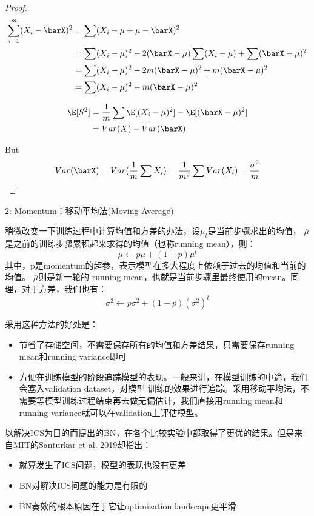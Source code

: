 \documentclass[11pt]{article}
\begin{document}
\begin{enumerate}
\begin{proof}
\begin{align*}
\sum_{i=1}^m(X_i-\barX)^2&=\sum(X_i-\mu+\mu-\barX)^2\\
&=\sum(X_i-\mu)^2-2(\barX-\mu)\sum(X_i-\mu)+\sum(\barX-\mu)^2\\
&=\sum(X_i-\mu)^2-2m(\barX-\mu)^2+m(\barX-\mu)^2\\
&=\sum(X_i-\mu)^2-m(\barX-\mu)^2
\end{align*}

\begin{align*}
\E[S^2]&=\frac{1}{m}\sum\E[(X_i-\mu)^2]-\E[(\barX-\mu)^2]\\
&=Var(X)-Var(\barX)
\end{align*}

But
\begin{equation*}
Var(\barX)=Var(\frac{1}{m}\sum X_i)=\frac{1}{m^2}\sum Var(X_i)=\frac{\sigma^2}{m}
\end{equation*}
\end{proof}


2: Momentum：移动平均法(Moving Average)

稍微改变一下训练过程中计算均值和方差的办法，设\(\mu_t\)是当前步骤求出的均值， \(\bar{\mu}\)是之前的训练步骤累积起来求得的均值（也称running mean），则：
\begin{equation*}
\bar{\mu}\gets p\bar{\mu}+(1-p)\mu^t
\end{equation*}
其中，p是momentum的超参，表示模型在多大程度上依赖于过去的均值和当前的均值。 \(\bar{\mu}\)则是新一轮的
ruuning mean，也就是当前步骤里最终使用的mean。同理，对于方差，我们也有：
\begin{equation*}
\bar{\sigma^2}\gets p\bar{\sigma^2}+(1-p)(\sigma^2)^t
\end{equation*}

采用这种方法的好处是：
\begin{itemize}
\item 节省了存储空间，不需要保存所有的均值和方差结果，只需要保存running mean和running variance即可
\item 方便在训练模型的阶段追踪模型的表现。一般来讲，在模型训练的中途，我们会塞入validation dataset，对模型
训练的效果进行追踪。采用移动平均法，不需要等模型训练过程结束再去做无偏估计，我们直接用running mean和
running variance就可以在validation上评估模型。
\end{itemize}



以解决ICS为目的而提出的BN，在各个比较实验中都取得了更优的结果。但是来自MIT的Santurkar et al. 2019却指出：

\begin{itemize}
\item 就算发生了ICS问题，模型的表现也没有更差
\item BN对解决ICS问题的能力是有限的
\item BN奏效的根本原因在于它让optimization landscape更平滑
\end{itemize}
\end{enumerate}
\end{document}

